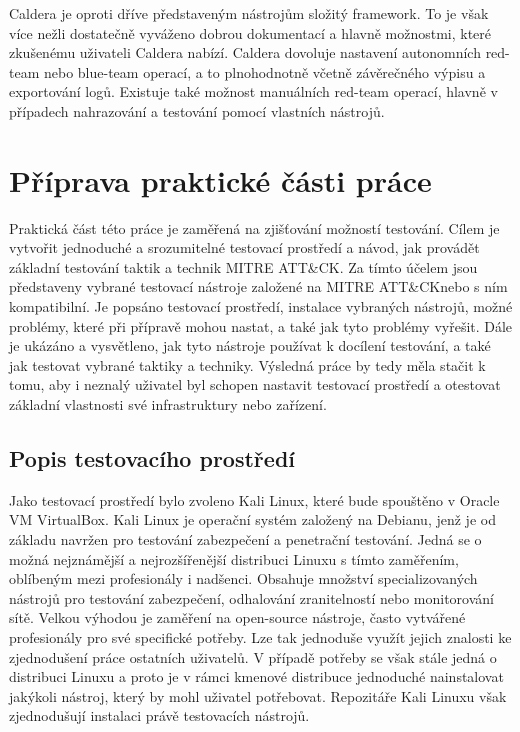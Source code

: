 Caldera je oproti dříve představeným nástrojům složitý framework.
To je však více nežli dostatečně vyváženo dobrou dokumentací a hlavně možnostmi, které zkušenému uživateli Caldera nabízí.
Caldera dovoluje nastavení autonomních red-team nebo blue-team operací, a to plnohodnotně včetně závěrečného výpisu a exportování logů.
Existuje také možnost manuálních red-team operací, hlavně v případech nahrazování a testování pomocí vlastních nástrojů.\cite{mitre_caldera_docs}


\section{Příprava praktické části práce}\label{sec:prakticka-cast}
Praktická část této práce je zaměřená na zjišťování možností testování.
Cílem je vytvořit jednoduché a srozumitelné testovací prostředí a návod, jak provádět základní testování taktik a technik MITRE ATT\&CK\@.
Za tímto účelem jsou představeny vybrané testovací nástroje založené na MITRE ATT\&CK\@ nebo s ním kompatibilní.
Je popsáno testovací prostředí, instalace vybraných nástrojů, možné problémy, které při přípravě mohou nastat, a také jak tyto problémy vyřešit.
Dále je ukázáno a vysvětleno, jak tyto nástroje používat k docílení testování, a také jak testovat vybrané taktiky a techniky.
Výsledná práce by tedy měla stačit k tomu, aby i neznalý uživatel byl schopen nastavit testovací prostředí a otestovat základní vlastnosti své infrastruktury nebo zařízení.


\subsection{Popis testovacího prostředí}\label{subsec:popis-testovaciho-prostredi}
Jako testovací prostředí bylo zvoleno Kali Linux, které bude spouštěno v Oracle VM VirtualBox.
Kali Linux je operační systém založený na Debianu, jenž je od základu navržen pro testování zabezpečení a penetrační testování.
Jedná se o možná nejznámější a nejrozšířenější distribuci Linuxu s tímto zaměřením, oblíbeným mezi profesionály i nadšenci.
Obsahuje množství specializovaných nástrojů pro testování zabezpečení, odhalování zranitelností nebo monitorování sítě.
Velkou výhodou je zaměření na open-source nástroje, často vytvářené profesionály pro své specifické potřeby.
Lze tak jednoduše využít jejich znalosti ke zjednodušení práce ostatních uživatelů.
V případě potřeby se však stále jedná o distribuci Linuxu a proto je v rámci kmenové distribuce jednoduché nainstalovat jakýkoli nástroj, který by mohl uživatel potřebovat.
Repozitáře Kali Linuxu však zjednodušují instalaci právě testovacích nástrojů.\cite{kali_mainpage}

